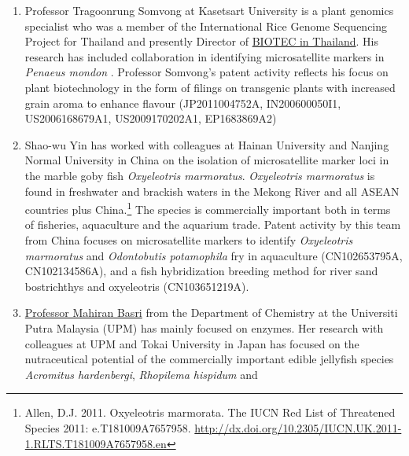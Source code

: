 \documentclass[]{book}
\theoremstyle{definition}
\theoremstyle{definition}
\theoremstyle{definition}
\theoremstyle{remark}
\begin{document}
\begin{enumerate}
  (see above) and demonstrated that the contryphan family of peptides is
  widely distributed in venoms of the fish-hunting cone snails.
  \citep[originally published 1998]{Jacobsen_2009}. Patent filings
  initially focused on the contryphan peptides (US6153738A,
  WO1999033865A1) with later filings focusing on kappaA conopeptides for
  use in combating multiple sclerosis and similar disorders
  (WO2000020018A1, US2003181368A1, US2006014673A1).
\item
  Professor Tragoonrung Somvong at Kasetsart University is a plant
  genomics specialist who was a member of the International Rice Genome
  Sequencing Project for Thailand and presently Director of
  \href{http://www.biotec.or.th/en/index.php/about-us/management-team}{BIOTEC
  in Thailand}. His research has included collaboration in identifying
  microsatellite markers in \emph{Penaeus mondon}
  \citep{Wuthisuthimethavee_2003}. Professor Somvong's patent activity
  reflects his focus on plant biotechnology in the form of filings on
  transgenic plants with increased grain aroma to enhance flavour
  (JP2011004752A, IN200600050I1, US2006168679A1, US2009170202A1,
  EP1683869A2)
\item
  Shao-wu Yin has worked with colleagues at Hainan University and
  Nanjing Normal University in China on the isolation of microsatellite
  marker loci in the marble goby fish \emph{Oxyeleotris marmoratus}.
  \emph{Oxyeleotris marmoratus} is found in freshwater and brackish
  waters in the Mekong River and all ASEAN countries plus
  China.\footnote{Allen, D.J. 2011. Oxyeleotris marmorata. The IUCN Red
    List of Threatened Species 2011: e.T181009A7657958.
    \url{http://dx.doi.org/10.2305/IUCN.UK.2011-1.RLTS.T181009A7657958.en}}
  The species is commercially important both in terms of fisheries,
  aquaculture and the aquarium trade. Patent activity by this team from
  China focuses on microsatellite markers to identify \emph{Oxyeleotris
  marmoratus} and \emph{Odontobutis potamophila} fry in aquaculture
  (CN102653795A, CN102134586A), and a fish hybridization breeding method
  for river sand bostrichthys and oxyeleotris (CN103651219A).
\item
  \href{https://www.researchgate.net/profile/Mahiran_Basri}{Professor
  Mahiran Basri} from the Department of Chemistry at the Universiti
  Putra Malaysia (UPM) has mainly focused on enzymes. Her research with
  colleagues at UPM and Tokai University in Japan has focused on the
  nutraceutical potential of the commercially important edible jellyfish
  species \emph{Acromitus hardenbergi}, \emph{Rhopilema hispidum} and

\end{enumerate}
\end{document}
